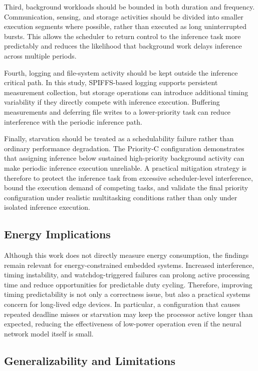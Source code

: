 \documentclass[conference]{IEEEtran}
\begin{document}
Third, background workloads should be bounded in both duration and frequency. Communication, sensing, and storage activities should be divided into smaller execution segments where possible, rather than executed as long uninterrupted bursts. This allows the scheduler to return control to the inference task more predictably and reduces the likelihood that background work delays inference across multiple periods.

Fourth, logging and file-system activity should be kept outside the inference critical path. In this study, SPIFFS-based logging supports persistent measurement collection, but storage operations can introduce additional timing variability if they directly compete with inference execution. Buffering measurements and deferring file writes to a lower-priority task can reduce interference with the periodic inference path.

Finally, starvation should be treated as a schedulability failure rather than ordinary performance degradation. The Priority-C configuration demonstrates that assigning inference below sustained high-priority background activity can make periodic inference execution unreliable. A practical mitigation strategy is therefore to protect the inference task from excessive scheduler-level interference, bound the execution demand of competing tasks, and validate the final priority configuration under realistic multitasking conditions rather than only under isolated inference execution.

\subsection{Energy Implications}
\label{subsec:energy_implications}

Although this work does not directly measure energy consumption, the findings remain relevant for energy-constrained embedded systems. Increased interference, timing instability, and watchdog-triggered failures can prolong active processing time and reduce opportunities for predictable duty cycling. Therefore, improving timing predictability is not only a correctness issue, but also a practical systems concern for long-lived edge devices. In particular, a configuration that causes repeated deadline misses or starvation may keep the processor active longer than expected, reducing the effectiveness of low-power operation even if the neural network model itself is small.

\subsection{Generalizability and Limitations}
\label{subsec:generalizability_limitations}
\end{document}
